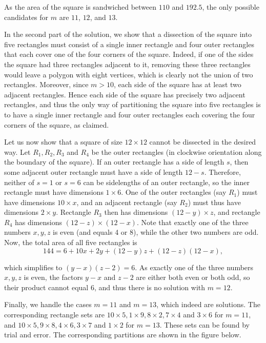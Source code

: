 \documentclass[a4paper, 12pt]{article}
\begin{document}
\begin{enumerate}
As the area of the square is sandwiched between $110$ and $192.5$, the only possible candidates for $m$ are $11$, $12$, and $13$.

In the second part of the solution, we show that a dissection of the square into five rectangles must consist of a single inner rectangle and four outer rectangles that each cover one of the four corners of the square. Indeed, if one of the sides the square had three rectangles adjacent to it, removing these three rectangles would leave a polygon with eight vertices, which is clearly not the union of two rectangles. Moreover, since $m > 10$, each side of the square has at least two adjacent rectangles. Hence each side of the square has precisely two adjacent rectangles, and thus the only way of partitioning the square into five rectangles is to have a single inner rectangle and four outer rectangles each covering the four corners of the square, as claimed.

Let us now show that a square of size $12 \times 12$ cannot be dissected in the desired way. Let $R_1, R_2, R_3$ and $R_4$ be the outer rectangles (in clockwise orientation along the boundary of the square). If an outer rectangle has a side of length $s$, then some adjacent outer rectangle must have a side of length $12 − s$. Therefore, neither of $s = 1$ or $s = 6$ can be sidelengths of an outer rectangle, so the inner rectangle must have dimensions $1 \times 6$. One of the outer rectangles (say $R_1$) must have dimensions $10 \times x$, and an adjacent rectangle (say $R_2$) must thus have dimensions $2 \times y$. Rectangle $R_3$ then has dimensions $(12 − y) \times z$, and rectangle $R_4$ has dimensions $(12 - z) \times (12 - x)$. Note that exactly one of the three numbers $x, y, z$ is even (and equals 4 or 8), while the other two numbers are odd. Now, the total area of all five rectangles is
$$ 144 = 6 + 10x + 2y + (12 - y) z + (12 - z)(12 - x), $$

which simplifies to $(y - x)(z - 2) = 6$. As exactly one of the three numbers $x, y, z$ is even, the factors $y - x$ and $z - 2$ are either both even or both odd, so their product cannot equal 6, and thus there is no solution with $m = 12$.

Finally, we handle the cases $m = 11$ and $m = 13$, which indeed are solutions. The corresponding rectangle sets are $10 \times 5, 1 \times 9, 8 \times 2, 7 \times 4$ and $3 \times 6$ for $m = 11$, and $10 \times 5, 9 \times 8, 4 \times 6, 3 \times 7$ and $1 \times 2$ for $m = 13$. These sets can be found by trial and error. The corresponding partitions are shown in the figure below.


\end{enumerate}
\end{document}
